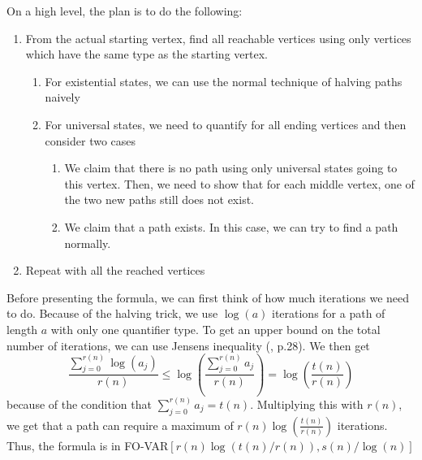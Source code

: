 On a high level, the plan is to do the following:
\begin{enumerate}
    \item From the actual starting vertex, find all reachable vertices using only vertices which have the same type as the starting vertex.
    \begin{enumerate}
        \item For existential states, we can use the normal technique of halving paths naively
        \item For universal states, we need to quantify for all ending vertices and then consider two cases
        \begin{enumerate}
            \item We claim that there is no path using only universal states going to this vertex.
            Then, we need to show that for each middle vertex, one of the two new paths still does not exist.
            \item We claim that a path exists.
            In this case, we can try to find a path normally.
        \end{enumerate}
    \end{enumerate}
    \item Repeat with all the reached vertices
\end{enumerate}

Before presenting the formula, we can first think of how much iterations we need to do.
Because of the halving trick, we use $\log(a)$ iterations for a path of length $a$ with only one quantifier type.
To get an upper bound on the total number of iterations, we can use Jensens inequality (\cite{inequalities-math-oly}, p.28).
We then get
\[
    \frac{\sum_{j = 0}^{r(n)}\log(a_{j})}{r(n)} \leq \log\left( \frac{\sum_{j= 0}^{r(n)}a_{j}}{r(n)} \right) = \log\left( \frac{t(n)}{r(n)} \right)
\]
because of the condition that $\sum_{j= 0}^{r(n)}a_{j} = t(n)$.
Multiplying this with $r(n)$, we get that a path can require a maximum of $r(n)\log\left( \frac{t(n)}{r(n)} \right)$ iterations.
Thus, the formula is in FO-VAR$\left[ r(n)\log\left( t(n)/r(n) \right), s(n)/\log(n) \right]$

